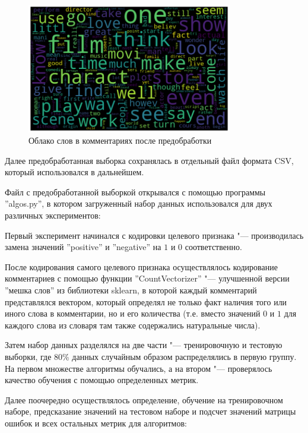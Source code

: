 \documentclass[bachelor, och, coursework]{SCWorks}
\begin{document}
        \begin{figure}[H]
            \centering
            \includegraphics[width=0.8\textwidth]{pic/cloud.png}
            \caption{Облако слов в комментариях после предобработки}
        \end{figure}

        Далее предобработанная выборка сохранялась в отдельный файл формата CSV,
        который использовался в дальнейшем.

        Файл с предобработанной выборкой открывался с помощью программы
        ''algos.py'', в котором загруженный набор данных использовался для двух
        различных экспериментов:
        
        Первый эксперимент начинался с кодировки целевого признака "---
        производилась замена значений ''positive'' и ''negative'' на $1$ и $0$
        соответственно.

        После кодирования самого целевого признака осуществлялось кодирование
        комментариев с помощью функции ''CountVectorizer'' "--- улучшенной
        версии ''мешка слов'' из библиотеки sklearn, в которой каждый
        комментарий представлялся вектором, который определял не только факт
        наличия того или иного слова в комментарии, но и его количества (т.е.
        вместо значений $0$ и $1$ для каждого слова из словаря там также
        содержались натуральные числа).

        Затем набор данных разделялся на две части "--- тренировочную и тестовую
        выборки, где 80\% данных случайным образом распределялись в первую
        группу. На первом множестве алгоритмы обучались, а на втором "---
        проверялось качество обучения с помощью определенных метрик.

        Далее поочередно осуществлялось определение, обучение на тренировочном
        наборе, предсказание значений на тестовом наборе и подсчет значений
        матрицы ошибок и всех остальных метрик для алгоритмов:
\end{document}
